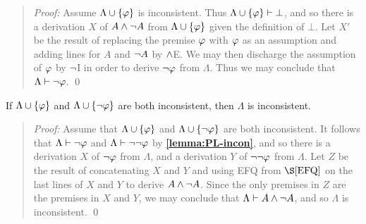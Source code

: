 \begin{quote} 
  \textit{Proof:} Assume $\Lambda\cup\lbrace\varphi\rbrace$ is inconsistent.
  Thus $\Lambda\cup\lbrace\varphi\rbrace\vdash \bot$, and so there is a derivation $X$ of $A\wedge\neg A$ from $\Lambda\cup\lbrace\varphi\rbrace$ given the definition of $\bot$. 
  Let $X'$ be the result of replacing the premise $\varphi$ with $\varphi$ as an assumption and adding lines for $A$ and $\neg A$ by $\wedge$E. 
  We may then discharge the assumption of $\varphi$ by $\neg$I in order to derive $\neg\varphi$ from $\Lambda$.
  Thus we may conclude that $\Lambda\vdash\neg\varphi$. 
  \qed
\end{quote}




\begin{Lthm} \label{lemma:PL-conin}
  If $\Lambda \cup \lbrace\varphi\rbrace$ and $\Lambda\cup \lbrace\neg\varphi\rbrace$ are both inconsistent, then $\Lambda$ is inconsistent. 
\end{Lthm} \vspace{-.2in}

\begin{quote} 
  \textit{Proof:} Assume that $\Lambda \cup \lbrace\varphi\rbrace$ and $\Lambda\cup \lbrace\neg\varphi\rbrace$ are both inconsistent.
  It follows that $\Lambda\vdash \neg\varphi$ and $\Lambda\vdash\neg\neg\varphi$ by \textbf{\ref{lemma:PL-incon}}, and so there is a derivation $X$ of $\neg\varphi$ from $\Lambda$, and a derivation $Y$ of $\neg\neg\varphi$ from $\Lambda$. 
  Let $Z$ be the result of concatenating $X$ and $Y$ and using EFQ from $\S\ref{EFQ}$ on the last lines of $X$ and $Y$ to derive $A\wedge\neg A$. 
  Since the only premises in $Z$ are the premises in $X$ and $Y$, we may conclude that $\Lambda\vdash A\wedge\neg A$, and so $\Lambda$ is inconsistent. 
  \qed
\end{quote}





%




